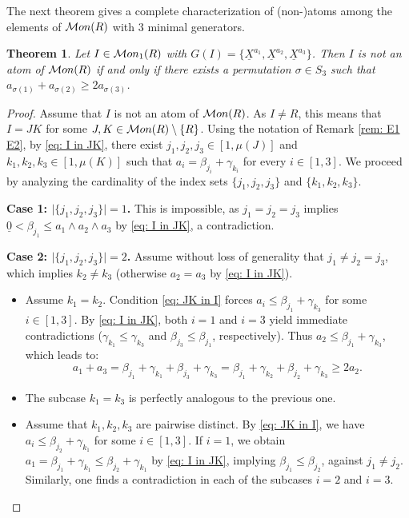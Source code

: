 \documentclass[10pt,a4paper]{amsart}
\newtheorem{theorem}{Theorem}[section]
\providecommand\Mon{{\mathcal{M}{\rm on}}}
\begin{document}
The next theorem gives a complete characterization of (non-)atoms among the elements of $\Mon(R)$ with $3$ minimal generators. 
\begin{theorem}\label{thm: 3-generated}
Let $I\in \Mon_1(R)$ with $G(I) = \{\underline X^{a_1},\underline X^{a_{2}}, \underline X^{a_3}\}$. Then $I$ is not an atom of $\Mon(R)$ if and only if there exists a permutation $\sigma\in S_3$ such that $a_{\sigma(1)}+a_{\sigma(2)}\ge 2a_{\sigma(3)}$.
\end{theorem}
\begin{proof}
Assume that $I$ is not an atom of $\Mon(R)$. As $I\ne R$, this means that $I=JK$ for some $J,K\in\Mon(R)\setminus\{R\}$. Using the notation of Remark \ref{rem: E1 E2}, 
by \ref{eq: I in JK}, there exist $j_1,j_2,j_3\in [1,\mu(J)]$ and $k_1,k_2,k_3\in [1,\mu(K)]$ such that $a_i=\beta_{j_i}+\gamma_{k_i}$ for every $i\in [1,3]$. We proceed by analyzing the cardinality of the index sets $\{j_1,j_2,j_3\}$ and $\{k_1,k_2,k_3\}$.

\medskip
\noindent\textbf{Case 1: $\lvert\{j_1,j_2,j_3\}\rvert = 1$.} 
This is impossible, as $j_1=j_2=j_3$ implies $\underline{0} < \beta_{j_1} \le a_1 \wedge a_2 \wedge a_3$ by \ref{eq: I in JK}, a contradiction.

\medskip
\noindent\textbf{Case 2: $\lvert\{j_1,j_2,j_3\}\rvert = 2$.} 
Assume without loss of generality that $j_1 \neq j_2 = j_3$, which implies $k_2 \neq k_3$ (otherwise $a_2=a_3$ by \ref{eq: I in JK}). 

\begin{itemize}
    \item Assume $k_1=k_2$. Condition \ref{eq: JK in I} forces $a_i \le \beta_{j_1} + \gamma_{k_3}$ for some $i\in[1,3]$. 
    By \ref{eq: I in JK}, both $i=1$ and $i=3$ yield immediate contradictions ($\gamma_{k_1} \le \gamma_{k_3}$ and $\beta_{j_3} \le \beta_{j_1}$, respectively). Thus $a_2 \le \beta_{j_1} + \gamma_{k_3}$, which leads to:
    \[ a_1+a_3 = \beta_{j_1}+\gamma_{k_1}+\beta_{j_3}+\gamma_{k_3}=\beta_{j_1}+\gamma_{k_2}+\beta_{j_2}+\gamma_{k_3} \ge 2a_2 .\]
    \item The subcase $k_1 = k_3$ is perfectly analogous to the previous one.
    \item Assume that $k_1,k_2, k_3$ are pairwise distinct. By \ref{eq: JK in I}, we have $a_i\le \beta_{j_2}+\gamma_{k_1}$ for some $i\in [1,3]$. If $i=1$, we obtain $a_1=\beta_{j_1}+\gamma_{k_1}\le \beta_{j_2}+\gamma_{k_1}$ by \ref{eq: I in JK}, implying $\beta_{j_1}\le \beta_{j_2}$, against $j_1\neq j_2$. Similarly, one finds a contradiction in each of the subcases $i=2$ and $i=3$.
\end{itemize}


\end{proof}
\end{document}

